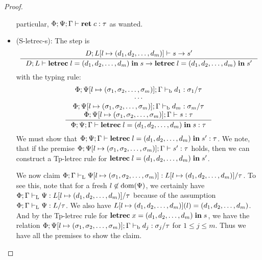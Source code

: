 \documentclass[a4paper, oneside, 10pt, draft]{memoir}
\begin{document}
\begin{proof}
\begin{itemize}
    particular, $\Phi;\Psi;\Gamma |- \mathbf{ret} \; c : \tau$ as wanted.
  \item (S-letrec-s):
    The step is
      \begin{equation*}
        \inference{D;L[l \mapsto \dbundle] |- s -> s'}
        {D;L |- \iletrec{l}{\dbundle}{s} -> \iletrec{l}{\dbundle}{s'}}
      \end{equation*}
    with the typing rule:
        \begin{equation}
          \label{eq:preserv-tp-letrec-s}
          \inference{\Phi;\Psi[l \mapsto \bbtypes];\Gamma \tpb d_1 :
            \sigma_1 / \tau\\
            \dotsb\\
            \Phi;\Psi[l \mapsto \bbtypes];\Gamma \tpb d_m : \sigma_m
            / \tau\\
            \Phi;\Psi[l \mapsto \bbtypes];\Gamma |- s : \tau}
          {\Phi;\Psi;\Gamma |- \iletrec{l}{\dbundle}{s} : \tau}\\\\
    \end{equation}
    We must show that $\Phi;\Psi;\Gamma |- \mathbf{letrec} \; l = (d_1, d_2, \dotsc, d_m) \; \mathbf{in} \; s' :
    \tau$. We note, that if the premise $\Phi;\Psi[l \mapsto
    (\sigma_1, \sigma_2, \dotsc, \sigma_m)];\Gamma |- s' : \tau$ holds, then we can construct a
    Tp-letrec rule for $\mathbf{letrec} \; l = (d_1, d_2, \dotsc, d_m) \; \mathbf{in} \; s'$.

    We now claim $\Phi;\Gamma |-_{\mathrm{L}} \Psi[l \mapsto (\sigma_1, \sigma_2, \dotsc, \sigma_m)] :
    L[l\mapsto (d_1, d_2, \dotsc, d_m)] / \tau$. To see this, note that for a fresh
    $l \not \in \mathrm{dom}(\Psi)$, we 
    certainly have $\Phi;\Gamma |-_{\mathrm{L}} \Psi : L[l\mapsto (d_1, d_2, \dotsc, d_m)] / \tau$
    because of the assumption $\Phi;\Gamma |-_{\mathrm{L}} \Psi : L / \tau$. We also
    have $L[l\mapsto (d_1, d_2, \dotsc, d_m)](l) = (d_1, d_2, \dotsc, d_m)$. And by the Tp-letrec
    rule for $\mathbf{letrec} \; x = (d_1, d_2, \dotsc, d_m) \; \mathbf{in} \; s$, we have the relation $\Phi;\Psi[l \mapsto
    (\sigma_1, \sigma_2, \dotsc, \sigma_m)];\Gamma |-_{\mathrm{b}} d_j : \sigma_j / \tau$ for $1 \leq j \leq
    m$. Thus we have all the premises to show the claim.


\end{itemize}
\end{proof}
\end{document}
